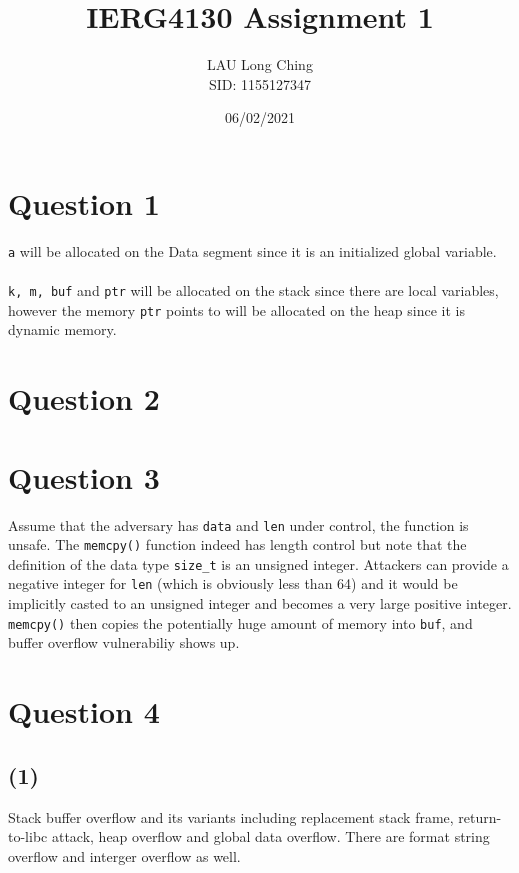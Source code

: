 \documentclass[a4paper]{article}
\title{\vspace{-1.5cm}IERG4130 Assignment 1}
\author{LAU Long Ching\\SID: 1155127347\\
        
}
\date{06/02/2021}
\begin{document}
\maketitle
\section*{Question 1}
\verb+a+ will be allocated on the Data segment since it is an initialized global variable.\\\\
\verb+k, m, buf+ and \verb+ptr+ will be allocated on the stack since there are local variables, however the memory \verb+ptr+ points to will be allocated on the heap since it is dynamic memory.
\section*{Question 2}
\begin{drawstack}
  \startframe
   
  \startframe
  \startframe
   
\end{drawstack}

\section*{Question 3}
Assume that the adversary has \verb+data+ and \verb+len+ under control, the function is unsafe. The \verb+memcpy()+ function indeed has length control but note that the definition of the data type \verb+size_t+ is an unsigned integer. Attackers can provide a negative integer for \verb+len+ (which is obviously less than 64) and it would be implicitly casted to an unsigned integer and becomes a very large positive integer. \verb+memcpy()+ then copies the potentially huge amount of memory into \verb+buf+, and buffer overflow vulnerabiliy shows up.

\pagebreak

\section*{Question 4}
\subsection*{(1)}
Stack buffer overflow and its variants including replacement stack frame, return-to-libc attack, heap overflow and global data overflow. There are format string overflow and interger overflow as well.
\end{document}
